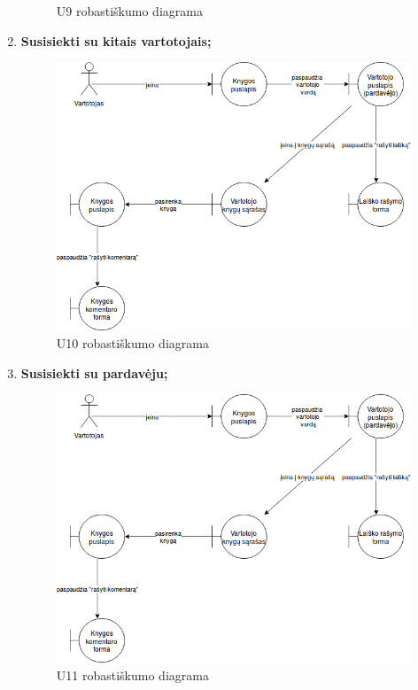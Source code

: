 \documentclass{VUMIFPSkursinis}
\begin{document}
\begin{enumerate}[label=\textbf{U\arabic*.}]
\begin{figure}[H]
					\caption{U9 robastiškumo diagrama}
					\label{img:psi2-u9-robustness}
				\end{figure}
			\item \textbf{Susisiekti su kitais vartotojais;}
				\begin{figure}[H]
					\centering
					\includegraphics[scale=0.6]{img/U10.png}
					\caption{U10 robastiškumo diagrama}
					\label{img:psi2-u10-robustness}
				\end{figure}
			\item \textbf{Susisiekti su pardavėju;}
				\begin{figure}[H]
					\centering
					\includegraphics[scale=0.6]{img/U11.png}
					\caption{U11 robastiškumo diagrama}

\end{figure}
\end{enumerate}
\end{document}
